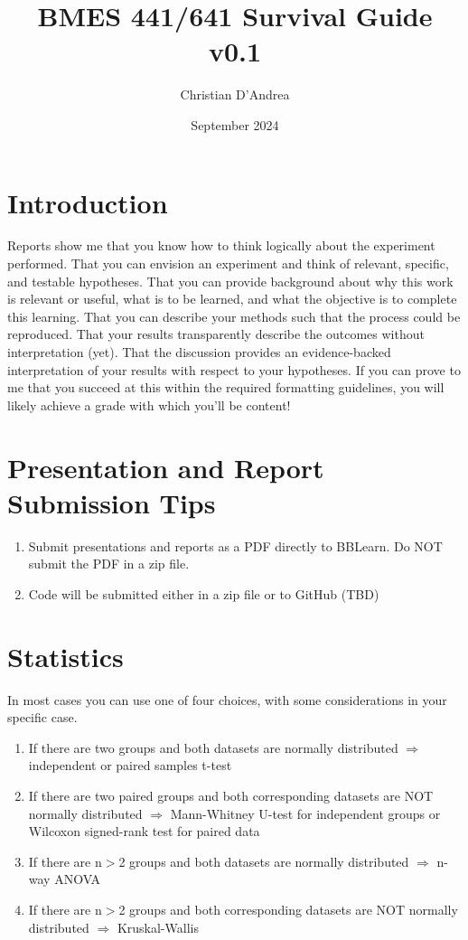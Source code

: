 \documentclass{article}
\title{BMES 441/641 Survival Guide v0.1}
\author{Christian D'Andrea }
\date{September 2024}
\begin{document}
\maketitle
\section{Introduction}
Reports show me that you know how to think logically about the experiment performed. That you can envision an experiment and think of relevant, specific, and testable hypotheses. That you can provide background about why this work is relevant or useful, what is to be learned, and what the objective is to complete this learning. That you can describe your methods such that the process could be reproduced. That your results transparently describe the outcomes without interpretation (yet). That the discussion provides an evidence-backed interpretation of your results with respect to your hypotheses. If you can prove to me that you succeed at this within the required formatting guidelines, you will likely achieve a grade with which you'll be content!

\section{Presentation and Report Submission Tips}
\begin{enumerate}
\item Submit presentations and reports as a PDF directly to BBLearn. Do NOT submit the PDF in a zip file.
\item Code will be submitted either in a zip file or to GitHub (TBD)
\end{enumerate}

\section{Statistics}
In most cases you can use one of four choices, with some considerations in your specific case.

\begin{enumerate}
\item If there are two groups and both datasets are normally distributed $\Rightarrow$ independent or paired samples t-test
\item If there are two paired groups and both corresponding datasets are NOT normally distributed $\Rightarrow$ Mann-Whitney U-test for independent groups or Wilcoxon signed-rank test for paired data 
\item If there are n$>$2 groups and both datasets are normally distributed $\Rightarrow$ n-way ANOVA
\item If there are n$>$2 groups and both corresponding datasets are NOT normally distributed $\Rightarrow$ Kruskal-Wallis
\end{enumerate}
\end{document}
